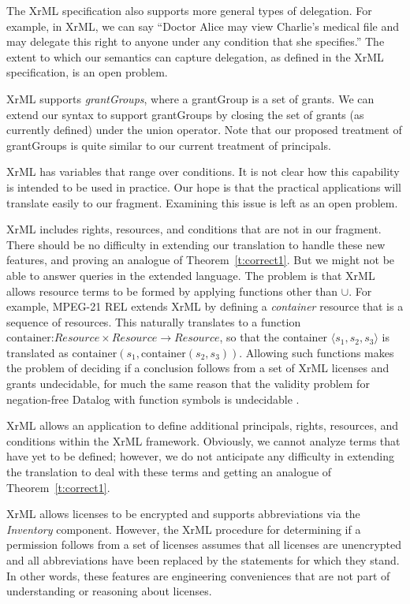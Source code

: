 \documentclass{acmtrans2m}
\newcommand{\<}{
}
\renewcommand{\>}{\rangle}
\newcommand{\union}{\cup}
\newcommand{\Rsrc}{\mathit{Resource}}
\begin{document}
\begin{itemize}
The XrML specification
also
supports more general types of delegation.  For
example, in XrML, we can
say ``Doctor Alice may view Charlie's medical file and may delegate this
right to anyone under
any condition that she specifies.''
The extent to which our semantics can capture delegation, as defined in the XrML specification,
is an open problem.
\item XrML supports \emph{grantGroups}, where a grantGroup is a set of grants.  We can extend our syntax
to support grantGroups by closing the set of grants (as currently defined) under the union operator.
Note that our proposed treatment of grantGroups is quite similar to our current treatment of principals.
\item XrML has variables that range over conditions.  It is
not clear how this capability
is intended to be used in practice.  Our hope is that the practical
applications will translate easily
to our fragment.  Examining this issue is left as an open problem.
\begin{sloppypar}
\item XrML includes rights, resources, and conditions that are not in our fragment.  There should be no
difficulty in extending our translation to handle these new features, and proving an analogue of
Theorem~\ref{t:correct1}.  But we might not be able to answer queries in the extended language.  The
problem is that XrML allows resource terms to be formed by applying functions other than $\union$.  For
example, MPEG-21 REL extends XrML by defining a \emph{container} resource that is a sequence of resources.
This naturally translates to a function $\mbox{container:}\Rsrc\times\Rsrc\longrightarrow\Rsrc$, so that
the container $\langle s_1, s_2, s_3\rangle$ is translated as
$\mbox{container}(s_1, \mbox{container}(s_2, s_3))$.  Allowing such functions makes the problem of deciding
if a conclusion follows from a set of XrML licenses and grants undecidable, for much the same reason that
the validity problem for negation-free Datalog with function symbols is undecidable \cite{NS}.
\end{sloppypar}
\item XrML allows an application to define additional principals, rights, resources, and conditions within
the XrML framework.  Obviously, we cannot analyze terms that have yet to be defined; however, we do not
anticipate any difficulty in extending the translation to deal with these terms and getting an analogue of
Theorem~\ref{t:correct1}.
\item XrML allows licenses to be encrypted and supports abbreviations via the \emph{Inventory} component.
However, the XrML procedure for determining if a permission follows from a set of licenses assumes that all
licenses are unencrypted and all abbreviations have been replaced by the statements for which they stand.
In other words, these features are engineering conveniences that are not part of understanding or reasoning
about licenses.
\end{itemize}
\end{document}
